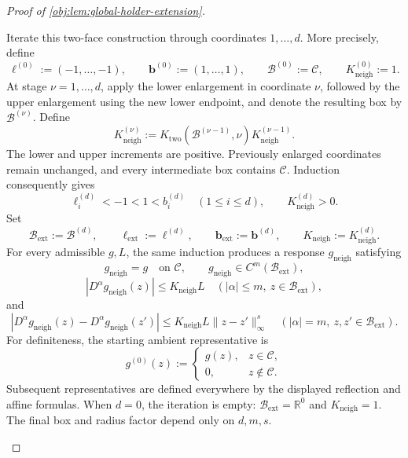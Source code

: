 \documentclass[11pt]{article}
\begin{document}
\begin{proof}[Proof of \cref{obj:lem:global-holder-extension}]
\begin{enumerate}
Iterate this two-face construction through coordinates \(1,\ldots,d\). More precisely, define
\[
\boldsymbol\ell^{(0)}:=(-1,\ldots,-1),
\qquad
\boldsymbol b^{(0)}:=(1,\ldots,1),
\qquad
\mathcal B^{(0)}:=\mathcal C,
\qquad
K_{\mathrm{neigh}}^{(0)}:=1.
\]
At stage \(\nu=1,\ldots,d\), apply the lower enlargement in coordinate \(\nu\), followed by the upper enlargement using the new lower endpoint, and denote the resulting box by \(\mathcal B^{(\nu)}\). Define
\[
K_{\mathrm{neigh}}^{(\nu)}
:=
K_{\mathrm{two}}(\mathcal B^{(\nu-1)},\nu)
K_{\mathrm{neigh}}^{(\nu-1)}.
\]
The lower and upper increments are positive. Previously enlarged coordinates remain unchanged, and every intermediate box contains \(\mathcal C\). Induction consequently gives
\[
\ell_i^{(d)}<-1<1<b_i^{(d)}
\quad(1\le i\le d),
\qquad
K_{\mathrm{neigh}}^{(d)}>0.
\]
Set
\[
\mathcal B_{\mathrm{ext}}
:=\mathcal B^{(d)},
\qquad
\boldsymbol\ell_{\mathrm{ext}}:=\boldsymbol\ell^{(d)},
\qquad
\boldsymbol b_{\mathrm{ext}}:=\boldsymbol b^{(d)},
\qquad
K_{\mathrm{neigh}}:=K_{\mathrm{neigh}}^{(d)}.
\]
For every admissible \(g,L\), the same induction produces a response \(g_{\mathrm{neigh}}\) satisfying
\[
g_{\mathrm{neigh}}=g\quad\text{on }\mathcal C,
\qquad
g_{\mathrm{neigh}}\in C^m(\mathcal B_{\mathrm{ext}}),
\]
\[
|D^\alpha g_{\mathrm{neigh}}(z)|
\le K_{\mathrm{neigh}}L
\quad(|\alpha|\le m,\ z\in\mathcal B_{\mathrm{ext}}),
\]
and
\[
|D^\alpha g_{\mathrm{neigh}}(z)-D^\alpha g_{\mathrm{neigh}}(z')|
\le K_{\mathrm{neigh}}L\|z-z'\|_\infty^s
\quad(|\alpha|=m,\ z,z'\in\mathcal B_{\mathrm{ext}}).
\]
For definiteness, the starting ambient representative is
\[
g^{(0)}(z):=
\begin{cases}
g(z),&z\in\mathcal C,\\
0,&z\notin\mathcal C.
\end{cases}
\]
Subsequent representatives are defined everywhere by the displayed reflection and affine formulas. When \(d=0\), the iteration is empty:
\(\mathcal B_{\mathrm{ext}}=\mathbb R^0\) and \(K_{\mathrm{neigh}}=1\).
The final box and radius factor depend only on \(d,m,s\).


\end{enumerate}
\end{proof}
\end{document}

